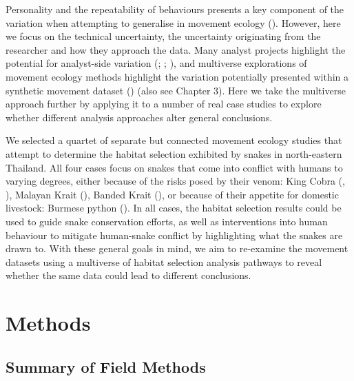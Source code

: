 \documentclass[10pt,a4paper]{article}
\begin{document}
Personality and the repeatability of behaviours presents a key component of the variation when attempting to generalise in movement ecology ().
However, here we focus on the technical uncertainty, the uncertainty originating from the researcher and how they approach the data.
Many analyst projects highlight the potential for analyst-side variation (; ; ), and multiverse explorations of movement ecology methods highlight the variation potentially presented within a synthetic movement dataset () (also see Chapter 3).
Here we take the multiverse approach further by applying it to a number of real case studies to explore whether different analysis approaches alter general conclusions.

We selected a quartet of separate but connected movement ecology studies that attempt to determine the habitat selection exhibited by snakes in north-eastern Thailand.
All four cases focus on snakes that come into conflict with humans to varying degrees, either because of the risks posed by their venom: King Cobra (, ), Malayan Krait (), Banded Krait (), or because of their appetite for domestic livestock: Burmese python ().
In all cases, the habitat selection results could be used to guide snake conservation efforts, as well as interventions into human behaviour to mitigate human-snake conflict by highlighting what the snakes are drawn to.
With these general goals in mind, we aim to re-examine the movement datasets using a multiverse of habitat selection analysis pathways to reveal whether the same data could lead to different conclusions.

\section{Methods}\label{methods}

\subsection{Summary of Field Methods}\label{summary-of-field-methods}
\end{document}
